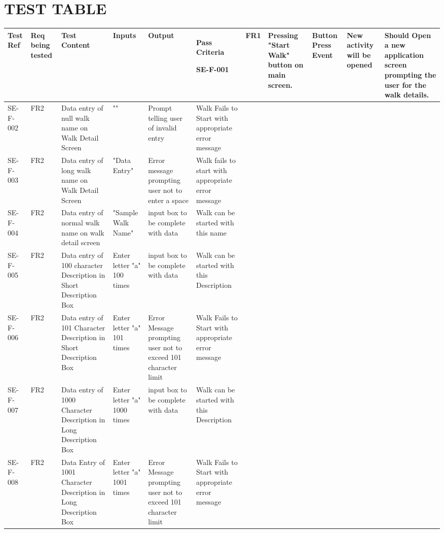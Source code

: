 \documentclass{project}
\begin{document}
\clearpage

\section{TEST TABLE}

\begin{longtable}{ | p{1cm} | p{1cm} | p{2.5cm} | p{2.5cm} | p{2.5cm} | p{2.5cm} |} 

\hline 
{\bf Test Ref} & {\bf Req being tested} & {\bf Test Content} & {\bf Inputs} & {\bf Output} & {\bf Pass Criteria} \endhead  \hline

SE-F-001 
& FR1
& Pressing "Start Walk" button on main screen. 
& Button Press Event 
& New activity will be opened
&  Should Open a new application screen prompting the user for the walk details. \\ \hline

SE-F-002
& FR2
& Data entry of null walk name on Walk Detail Screen  
& "" 
& Prompt telling user of invalid entry
& Walk Fails to Start with appropriate error message\\ \hline

SE-F-003 
& FR2
& Data entry of long walk name on Walk Detail Screen  
& "Data Entry"
& Error message prompting user not to enter a space
& Walk fails to start with appropriate error message\\ \hline

SE-F-004
& FR2
& Data entry of normal walk name on walk detail screen
& "Sample Walk Name"
& input box to be complete with data
& Walk can be started with this name \\ \hline

SE-F-005
& FR2
& Data entry of 100 character Description in Short Description Box
& Enter letter "a" 100 times
& input box to be complete with data
& Walk can be started with this Description \\ \hline

SE-F-006
& FR2
& Data entry of 101 Character Description in Short Description Box
& Enter letter "a" 101 times
& Error Message prompting user not to exceed 101 character limit
& Walk Fails to Start with appropriate error message \\ \hline

SE-F-007
& FR2
& Data entry of 1000 Character Description in Long Description Box
& Enter letter "a" 1000 times
& input box to be complete with data
& Walk can be started with this Description \\ \hline

SE-F-008
& FR2
& Data Entry of 1001 Character Description in Long Description Box
& Enter letter "a" 1001 times
& Error Message prompting user not to exceed 101 character limit
& Walk Fails to Start with appropriate error message \\ \hline


\end{longtable}
\end{document}
